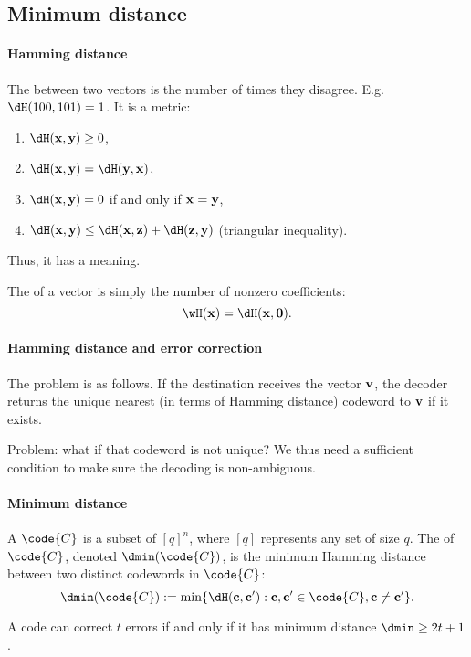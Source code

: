 \documentclass[a4paper, 11pt, openany]{book}
\begin{document}
\subsection{Minimum distance}

\paragraph{Hamming distance}
The  between two vectors is the number of times they disagree. E.g. $\dH(100,101) = 1$. It is a metric:
\begin{enumerate}
	\item $\dH({\bf x},{\bf y}) \ge 0$,
	\item $\dH({\bf x},{\bf y}) = \dH({\bf y},{\bf x})$,
	\item $\dH({\bf x},{\bf y}) = 0$ if and only if ${\bf x}={\bf y}$,
	\item $\dH({\bf x},{\bf y}) \le \dH({\bf x},{\bf z}) + \dH({\bf z},{\bf y})$ (triangular inequality).
\end{enumerate}
Thus, it has a  meaning.

The  of a vector is simply the number of nonzero coefficients:
\[
	\wH({\bf x}) = \dH({\bf x}, {\bf 0}).
\]


\paragraph{Hamming distance and error correction}
The  problem is as follows. If the destination receives the vector ${\bf v}$, the decoder returns the unique nearest (in terms of Hamming distance) codeword to ${\bf v}$ if it exists.

Problem: what if that codeword is not unique? We thus need a sufficient condition to make sure the decoding is non-ambiguous.


\paragraph{Minimum distance}
A  $\code{C}$ is a subset of $[q]^n$, where $[q]$ represents any set of size $q$. The  of $\code{C}$, denoted $\dmin(\code{C})$, is the minimum Hamming distance between two distinct codewords in $\code{C}$:
\[
    \dmin(\code{C}) := \min\{ \dH({\bf c}, {\bf c}'): {\bf c}, {\bf c}' \in \code{C}, {\bf c} \ne {\bf c}' \}.
\]

\begin{theorem}
A code can correct $t$ errors if and only if it has minimum distance $\dmin \ge 2t+1$.
\end{theorem}
\end{document}
